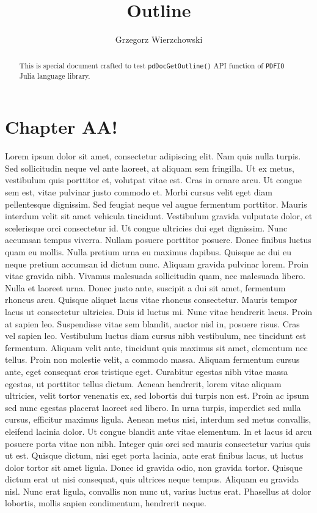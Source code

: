 \documentclass[a4paper,10pt]{report}
\title{Outline}
\author{Grzegorz Wierzchowski}
\begin{document}
\maketitle

\begin{abstract}
This is special document crafted to test \verb|pdDocGetOutline()| API function of \verb|PDFIO| Julia language library.
\end{abstract}

\tableofcontents

\chapter{Chapter AA!}
Lorem ipsum dolor sit amet, consectetur adipiscing elit. Nam quis nulla turpis. Sed sollicitudin
neque vel ante laoreet, at aliquam sem fringilla. Ut ex metus, vestibulum quis porttitor et, volutpat
vitae est. Cras in ornare arcu. Ut congue sem est, vitae pulvinar justo commodo et. Morbi cursus
velit eget diam pellentesque dignissim. Sed feugiat neque vel augue fermentum porttitor. Mauris
interdum velit sit amet vehicula tincidunt.
Vestibulum gravida vulputate dolor, et scelerisque orci consectetur id. Ut congue ultricies dui eget
dignissim. Nunc accumsan tempus viverra. Nullam posuere porttitor posuere. Donec finibus luctus
quam eu mollis. Nulla pretium urna eu maximus dapibus. Quisque ac dui eu neque pretium
accumsan id dictum nunc. Aliquam gravida pulvinar lorem. Proin vitae gravida nibh.
Vivamus malesuada sollicitudin quam, nec malesuada libero. Nulla et laoreet urna. Donec justo
ante, suscipit a dui sit amet, fermentum rhoncus arcu. Quisque aliquet lacus vitae rhoncus
consectetur. Mauris tempor lacus ut consectetur ultricies. Duis id luctus mi. Nunc vitae hendrerit
lacus. Proin at sapien leo.
Suspendisse vitae sem blandit, auctor nisl in, posuere risus. Cras vel sapien leo. Vestibulum luctus
diam cursus nibh vestibulum, nec tincidunt est fermentum. Aliquam velit ante, tincidunt quis
maximus sit amet, elementum nec tellus. Proin non molestie velit, a commodo massa. Aliquam
fermentum cursus ante, eget consequat eros tristique eget. Curabitur egestas nibh vitae massa
egestas, ut porttitor tellus dictum.
Aenean hendrerit, lorem vitae aliquam ultricies, velit tortor venenatis ex, sed lobortis dui turpis non
est. Proin ac ipsum sed nunc egestas placerat laoreet sed libero. In urna turpis, imperdiet sed nulla
cursus, efficitur maximus ligula. Aenean metus nisi, interdum sed metus convallis, eleifend lacinia
dolor. Ut congue blandit ante vitae elementum. In et lacus id arcu posuere porta vitae non nibh.
Integer quis orci sed mauris consectetur varius quis ut est. Quisque dictum, nisi eget porta lacinia,
ante erat finibus lacus, ut luctus dolor tortor sit amet ligula. Donec id gravida odio, non gravida
tortor. Quisque dictum erat ut nisi consequat, quis ultrices neque tempus. Aliquam eu gravida nisl.
Nunc erat ligula, convallis non nunc ut, varius luctus erat. Phasellus at dolor lobortis, mollis sapien
condimentum, hendrerit neque.
\end{document}
